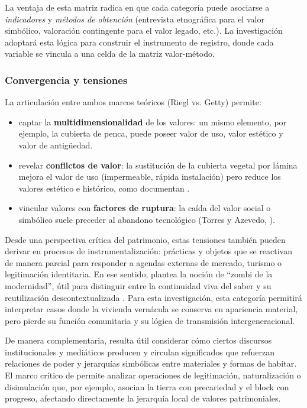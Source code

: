La ventaja de esta matriz radica en que cada categoría puede
asociarse a \emph{indicadores} y \emph{métodos de obtención} (entrevista
etnográfica para el valor simbólico, valoración contingente para el
valor legado, etc.).
La investigación adoptará esta lógica para construir el instrumento de
registro, donde cada variable se vincula a una
celda de la matriz valor-método.

\subsubsection{Convergencia y tensiones}

La articulación entre ambos marcos teóricos (Riegl vs. Getty) permite:

\begin{itemize}
	\item captar la \textbf{multidimensionalidad} de los valores:
	      un mismo elemento, por ejemplo, la cubierta de penca, puede
	      poseer valor de uso, valor estético y valor de antigüedad.
	\item revelar \textbf{conflictos de valor}: la sustitución de la
	      cubierta vegetal por lámina mejora el valor de uso (impermeable,
	      rápida instalación) pero reduce los valores estético e
	      histórico, como documentan
	      \cite{juarez2018transformacion,alvarez2003maguey}.
	\item vincular valores con \textbf{factores de ruptura}: la caída del
	      valor social o simbólico suele preceder al abandono
	      tecnológico (Torres y Azevedo, \citeyear{torres2021transmision}).
\end{itemize}

Desde una perspectiva crítica del patrimonio, estas tensiones también
pueden derivar en procesos de instrumentalización: prácticas y objetos
que se reactivan de manera parcial para responder a agendas externas de
mercado, turismo o legitimación identitaria. En ese sentido,
\citeauthor{i2008zombi} plantea la noción de \enquote{zombi de la
modernidad}, útil para distinguir entre la continuidad viva del saber y
su reutilización descontextualizada \citep{i2008zombi}. Para esta
investigación, esta categoría permitirá interpretar casos donde la
vivienda vernácula se conserva en apariencia material, pero pierde su
función comunitaria y su lógica de transmisión intergeneracional.

De manera complementaria, resulta útil considerar cómo ciertos discursos
institucionales y mediáticos producen y circulan significados que
refuerzan relaciones de poder y jerarquías simbólicas entre materiales y
formas de habitar.  El marco crítico de \citeauthor{thompson1990}
permite analizar operaciones de legitimación, naturalización o
disimulación que, por ejemplo, asocian la tierra con precariedad y el
block con progreso, afectando directamente la jerarquía local de valores
patrimoniales.\citep{thompson1990}

